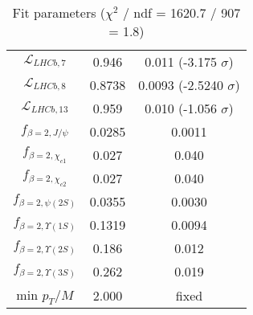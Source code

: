\begin{table}[h!]
\begin{tabular}{c|c|c}
$\mathcal L_{LHCb,7}$ & 0.946 & 0.011 (-3.175 $\sigma$) \\
$\mathcal L_{LHCb,8}$ & 0.8738 & 0.0093 (-2.5240 $\sigma$) \\
$\mathcal L_{LHCb,13}$ & 0.959 & 0.010 (-1.056 $\sigma$) \\
$f_{\beta=2,J/\psi}$ & 0.0285 & 0.0011 \\
$f_{\beta=2,\chi_{c1}}$ & 0.027 & 0.040 \\
$f_{\beta=2,\chi_{c2}}$ & 0.027 & 0.040 \\
$f_{\beta=2,\psi(2S)}$ & 0.0355 & 0.0030 \\
$f_{\beta=2,\Upsilon(1S)}$ & 0.1319 & 0.0094 \\
$f_{\beta=2,\Upsilon(2S)}$ & 0.186 & 0.012 \\
$f_{\beta=2,\Upsilon(3S)}$ & 0.262 & 0.019 \\
min $p_T/M$ & 2.000 & fixed \\
\end{tabular}
\caption{Fit parameters ($\chi^2$ / ndf = 1620.7 / 907 = 1.8)}
\end{table}
